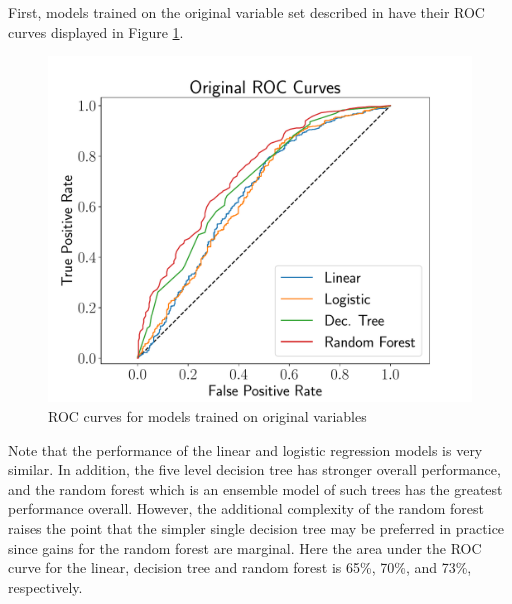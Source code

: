 \documentclass[10pt]{article}
\begin{document}
First, models trained on the original variable set described in \cite{Smart2016} 
have their ROC curves displayed in Figure \ref{fig:orgroc}.
%
\begin{figure}[thb]
    \centering
	\includegraphics[width=1.0\linewidth]{oriROC.pdf}
	\caption{ROC curves for models trained on original variables}
	\label{fig:orgroc}
\end{figure}
%
Note that the performance of the linear and logistic regression models is very similar. 
In addition, the five level decision tree has stronger overall performance, and the 
random forest which is an ensemble model of such trees has the greatest performance overall.
However, the additional complexity of the random forest raises the point that the simpler 
single decision tree may be preferred in practice since gains for the random forest 
are marginal.  Here the area under the ROC curve for the linear, decision tree and random forest 
is 65\%, 70\%, and 73\%, respectively.  
\end{document}
